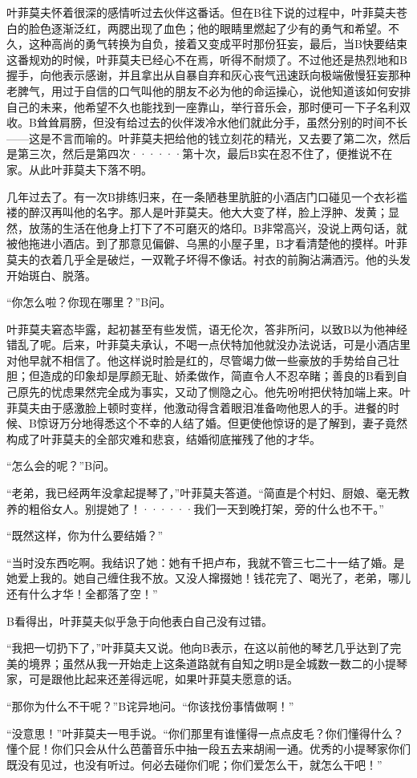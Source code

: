 \documentclass[12pt, UTF8]{ctexbook}
\begin{document}
\par 叶菲莫夫怀着很深的感情听过去伙伴这番话。但在B往下说的过程中，叶菲莫夫苍白的脸色逐渐泛红，两腮出现了血色；他的眼睛里燃起了少有的勇气和希望。不久，这种高尚的勇气转换为自负，接着又变成平时那份狂妄，最后，当B快要结束这番规劝的时候，叶菲莫夫已经心不在焉，听得不耐烦了。不过他还是热烈地和B握手，向他表示感谢，并且拿出从自暴自弃和灰心丧气迅速跃向极端傲慢狂妄那种老脾气，用过于自信的口气叫他的朋友不必为他的命运操心，说他知道该如何安排自己的未来，他希望不久也能找到一座靠山，举行音乐会，那时便可一下子名利双收。B耸耸肩膀，但没有给过去的伙伴泼冷水他们就此分手，虽然分别的时间不长——这是不言而喻的。叶菲莫夫把给他的钱立刻花的精光，又去要了第二次，然后是第三次，然后是第四次······第十次，最后B实在忍不住了，便推说不在家。从此叶菲莫夫下落不明。
\par 几年过去了。有一次B排练归来，在一条陋巷里肮脏的小酒店门口碰见一个衣衫褴褛的醉汉再叫他的名字。那人是叶菲莫夫。他大大变了样，脸上浮肿、发黄；显然，放荡的生活在他身上打下了不可磨灭的烙印。B非常高兴，没说上两句话，就被他拖进小酒店。到了那意见偏僻、乌黑的小屋子里，B才看清楚他的摸样。叶菲莫夫的衣着几乎全是破烂，一双靴子坏得不像话。衬衣的前胸沾满酒污。他的头发开始斑白、脱落。
\par “你怎么啦？你现在哪里？”B问。
\par 叶菲莫夫窘态毕露，起初甚至有些发慌，语无伦次，答非所问，以致B以为他神经错乱了呢。后来，叶菲莫夫承认，不喝一点伏特加他就没办法说话，可是小酒店里对他早就不相信了。他这样说时脸是红的，尽管竭力做一些豪放的手势给自己壮胆；但造成的印象却是厚颜无耻、娇柔做作，简直令人不忍卒睹；善良的B看到自己原先的忧虑果然完全成为事实，又动了恻隐之心。他先吩咐把伏特加端上来。叶菲莫夫由于感激脸上顿时变样，他激动得含着眼泪准备吻他恩人的手。进餐的时候、B惊讶万分地得悉这个不幸的人结了婚。但更使他惊讶的是了解到，妻子竟然构成了叶菲莫夫的全部灾难和悲哀，结婚彻底摧残了他的才华。
\par “怎么会的呢？”B问。
\par “老弟，我已经两年没拿起提琴了，”叶菲莫夫答道。“简直是个村妇、厨娘、毫无教养的粗俗女人。别提她了！······我们一天到晚打架，旁的什么也不干。”
\par “既然这样，你为什么要结婚？”
\par “当时没东西吃啊。我结识了她：她有千把卢布，我就不管三七二十一结了婚。是她爱上我的。她自己缠住我不放。又没人撺掇她！钱花完了、喝光了，老弟，哪儿还有什么才华！全都落了空！”
\par B看得出，叶菲莫夫似乎急于向他表白自己没有过错。
\par “我把一切扔下了，”叶菲莫夫又说。他向B表示，在这以前他的琴艺几乎达到了完美的境界；虽然从我一开始走上这条道路就有自知之明B是全城数一数二的小提琴家，可是跟他比起来还差得远呢，如果叶菲莫夫愿意的话。
\par “那你为什么不干呢？”B诧异地问。“你该找份事情做啊！”
\par “没意思！”叶菲莫夫一甩手说。“你们那里有谁懂得一点点皮毛？你们懂得什么？懂个屁！你们只会从什么芭蕾音乐中抽一段五去来胡闹一通。优秀的小提琴家你们既没有见过，也没有听过。何必去碰你们呢；你们爱怎么干，就怎么干吧！”
\par
\par
\par
\par
\par
\par
\par
\par
\end{document}
